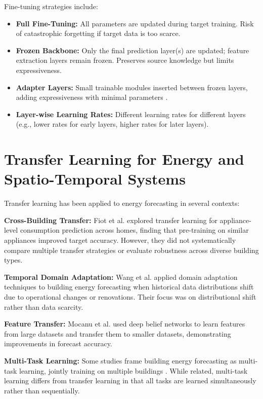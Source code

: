 \documentclass[12pt,a4paper]{report}
\begin{document}
Fine-tuning strategies include:

\begin{itemize}
    \item \textbf{Full Fine-Tuning:} All parameters are updated during target training. Risk of catastrophic forgetting if target data is too scarce.
    \item \textbf{Frozen Backbone:} Only the final prediction layer(s) are updated; feature extraction layers remain frozen. Preserves source knowledge but limits expressiveness.
    \item \textbf{Adapter Layers:} Small trainable modules inserted between frozen layers, adding expressiveness with minimal parameters \cite{houlsby2019parameter}.
    \item \textbf{Layer-wise Learning Rates:} Different learning rates for different layers (e.g., lower rates for early layers, higher rates for later layers).
\end{itemize}

\section{Transfer Learning for Energy and Spatio-Temporal Systems}

Transfer learning has been applied to energy forecasting in several contexts:

\textbf{Cross-Building Transfer:} Fiot et al. \cite{fiot2013class} explored transfer learning for appliance-level consumption prediction across homes, finding that pre-training on similar appliances improved target accuracy. However, they did not systematically compare multiple transfer strategies or evaluate robustness across diverse building types.

\textbf{Temporal Domain Adaptation:} Wang et al. \cite{wang2018building} applied domain adaptation techniques to building energy forecasting when historical data distributions shift due to operational changes or renovations. Their focus was on distributional shift rather than data scarcity.

\textbf{Feature Transfer:} Mocanu et al. \cite{mocanu2016deep} used deep belief networks to learn features from large datasets and transfer them to smaller datasets, demonstrating improvements in forecast accuracy.

\textbf{Multi-Task Learning:} Some studies frame building energy forecasting as multi-task learning, jointly training on multiple buildings \cite{ribeiro2018transfer}. While related, multi-task learning differs from transfer learning in that all tasks are learned simultaneously rather than sequentially.
\end{document}
